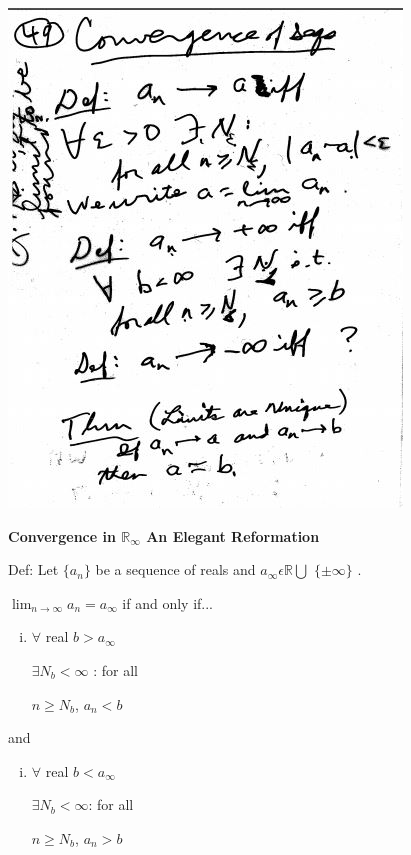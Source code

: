 \documentclass[10pt,a4paper]{article}
\begin{document}
\includegraphics[scale=.8]{Pages/S&L_page49(1)}

\newpage

{\bf Convergence in $\mathbb {R}_{\infty}$ An Elegant Reformation}

Def: Let $\{ a_{n} \}$ be a sequence of reals and $a_{\infty} \epsilon \mathbb {R} \bigcup$ $\{  \pm \infty \}$ .

$\lim_{n \rightarrow \infty} a_{n} = a_{\infty}$ if and only if...

\begin{enumerate} [(i)]

\item $\forall$ real $b > a_{\infty}$

$\exists N_{b} < \infty$ : for all

$n \geq N_{b}$, $a_{n} < b$

\end{enumerate}

and

\begin{enumerate} [(ii)]

\item $\forall$ real $b < a_{\infty}$

$\exists N_{b} < \infty$: for all

$n \geq N_{b}$, $a_{n} > b$

\end{enumerate}
\end{document}
